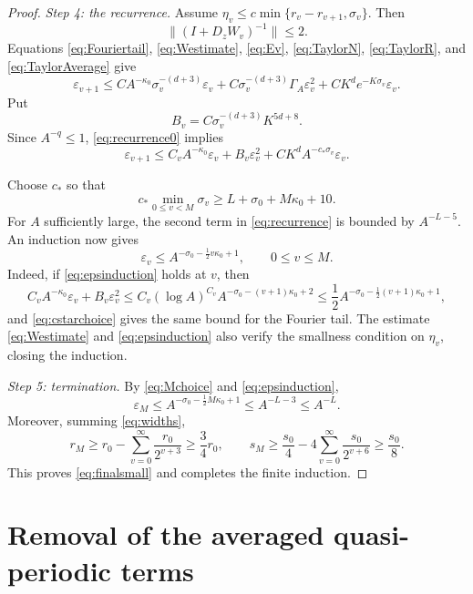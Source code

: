 \documentclass[11pt]{amsart}
\theoremstyle{remark}
\newcommand{\eps}{\varepsilon}
\newcommand{\norm}[1]{\lVert #1\rVert}
\begin{document}
\begin{proof}
\smallskip
\noindent\emph{Step 4: the recurrence.}
Assume $\eta_v\leq c\min\{r_v-r_{v+1},\sigma_v\}$.
Then
\[
 \norm{(I+D_zW_v)^{-1}}\leq2.
\]
Equations \eqref{eq:Fouriertail},
\eqref{eq:Westimate}, \eqref{eq:Ev},
\eqref{eq:TaylorN}, \eqref{eq:TaylorR}, and
\eqref{eq:TaylorAverage} give
\begin{equation}\label{eq:recurrence0}
 \eps_{v+1}
 \leq
 C A^{-\kappa_0}\sigma_v^{-(d+3)}\eps_v
 +C\sigma_v^{-(d+3)}\Gamma_A\eps_v^2
 +C K^d e^{-K\sigma_v}\eps_v.
\end{equation}
Put
\begin{equation}\label{eq:Bv}
 B_v=C\sigma_v^{-(d+3)}K^{5d+8}.
\end{equation}
Since $A^{-q}\leq1$, \eqref{eq:recurrence0} implies
\begin{equation}\label{eq:recurrence}
 \eps_{v+1}
 \leq C_vA^{-\kappa_0}\eps_v
 +B_v\eps_v^2
 +CK^dA^{-c_*\sigma_v}\eps_v.
\end{equation}

Choose $c_*$ so that
\begin{equation}\label{eq:cstarchoice}
 c_*\min_{0\leq v<M}\sigma_v\geq L+\sigma_0+M\kappa_0+10.
\end{equation}
For $A$ sufficiently large, the second term in
\eqref{eq:recurrence} is bounded by $A^{-L-5}$.
An induction now gives
\begin{equation}\label{eq:epsinduction}
 \eps_v\leq A^{-\sigma_0-\frac12v\kappa_0+1},
 \qquad 0\leq v\leq M.
\end{equation}
Indeed, if \eqref{eq:epsinduction} holds at $v$, then
\[
 C_vA^{-\kappa_0}\eps_v+B_v\eps_v^2
 \leq
 C_v(\log A)^{C_v}
 A^{-\sigma_0-(v+1)\kappa_0+2}
 \leq
 \frac12A^{-\sigma_0-\frac12(v+1)\kappa_0+1},
\]
and \eqref{eq:cstarchoice} gives the same bound for the Fourier tail.
The estimate \eqref{eq:Westimate} and \eqref{eq:epsinduction} also verify
the smallness condition on $\eta_v$, closing the induction.

\smallskip
\noindent\emph{Step 5: termination.}
By \eqref{eq:Mchoice} and \eqref{eq:epsinduction},
\[
 \eps_M\leq
 A^{-\sigma_0-\frac12M\kappa_0+1}
 \leq A^{-L-3}\leq A^{-L}.
\]
Moreover, summing \eqref{eq:widths},
\[
 r_M\geq r_0-\sum_{v=0}^{\infty}\frac{r_0}{2^{v+3}}
 \geq\frac34r_0,
\qquad
 s_M\geq\frac{s_0}{4}
 -4\sum_{v=0}^{\infty}\frac{s_0}{2^{v+6}}
 \geq\frac{s_0}{8}.
\]
This proves \eqref{eq:finalsmall} and completes the finite induction.
\end{proof}

\section{Removal of the averaged quasi-periodic terms}
\end{document}

